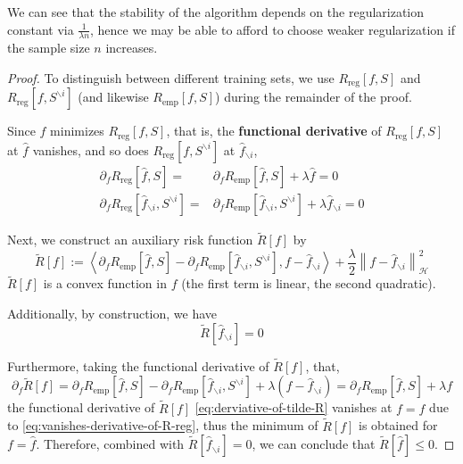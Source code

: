 \begin{remark}
	We can see that the stability of the algorithm depends on the regularization constant via $\frac{1}{\lambda n}$, hence we may be able to afford to choose weaker regularization if the sample size $n$ increases.
\end{remark}

\begin{proof}
	To distinguish between different training sets, we use $R_{\text{reg}}[f, S]$ and $R_{\text{reg}}[f, S^{\backslash i}]$ (and likewise $R_{\text{emp}}[f, S]$) during the remainder of the proof.

	Since $\hat{f}$ minimizes $R_{\text{reg}}[f,S]$, that is, the \textbf{functional derivative} \cite{stephane_canu_lecture_2014} of $R_{\text{reg}}[f,S]$ at $\hat{f}$ vanishes, and so does $R_{\text{reg}}[f,S^{\backslash i}]$ at $\hat{f}_{\backslash i}$,
	\begin{equation}
		\label{eq:vanishes-derivative-of-R-reg}
		\begin{aligned}
			\partial_{f}R_{\text{reg}}\left[\hat{f},S\right]=                               & \partial_{f}R_{\text{emp}}\left[\hat{f},S\right]+\lambda\hat{f}=0                                              \\
			\partial_{f}R_{\text{reg}}\left[\hat{f}_{\backslash i},S^{\backslash i}\right]= & \partial_{f}R_{\text{emp}}\left[\hat{f}_{\backslash i},S^{\backslash i}\right]+\lambda\hat{f}_{\backslash i}=0
		\end{aligned}
	\end{equation}

	Next, we construct an auxiliary risk function $\tilde{R}[f]$ by
	\begin{equation}
		\tilde{R}[f]:=\left\langle\partial_{f}R_{\text{emp}}\left[\hat{f},S\right]-\partial_{f}R_{\text{emp}}\left[\hat{f}_{\backslash i},S^{\backslash i}\right],f-\hat{f}_{\backslash i}\right\rangle+\frac{\lambda}{2}\left\|f-\hat{f}_{\backslash i}\right\|_{\mathcal{H}}^{2}
	\end{equation}
	$\tilde{R}[f]$ is a convex function in $f$ (the first term is linear, the second quadratic).

	Additionally, by construction, we have
	\begin{equation}
		\tilde{R}[\hat{f}_{\backslash i}]=0
	\end{equation}

	Furthermore, taking the functional derivative of $\tilde{R}[f]$, that,
	\begin{equation}
		\label{eq:derviative-of-tilde-R}
		\partial_{f}\tilde{R}[f]=\partial_{f}R_{\text{emp}}\left[\hat{f},S\right]-\partial_{f}R_{\text{emp}}\left[\hat{f}_{\backslash i},S^{\backslash i}\right]+\lambda\left(f-\hat{f}_{\backslash i}\right)=\partial_{f}R_{\text{emp}}\left[\hat{f},S\right]+\lambda f
	\end{equation}
	the functional derivative of $\tilde{R}[f]$ \eqref{eq:derviative-of-tilde-R} vanishes at $f=\hat{f}$ due to \eqref{eq:vanishes-derivative-of-R-reg}, thus the minimum of $\tilde{R}[f]$ is obtained for $f=\hat{f}$. Therefore, combined with $\tilde{R}[\hat{f}_{\backslash i}]=0$, we can conclude that $\tilde{R}[\hat{f}]\leq 0$.


\end{proof}
